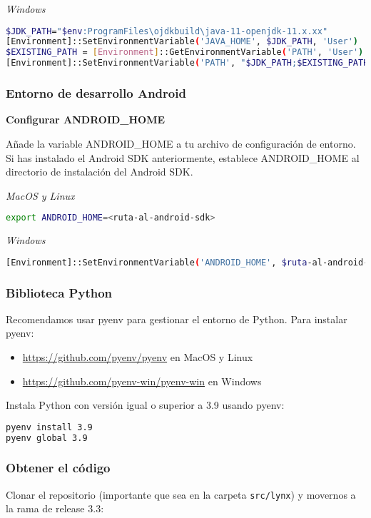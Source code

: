 \textit{Windows}
\begin{lstlisting}[language=bash]
$JDK_PATH="$env:ProgramFiles\ojdkbuild\java-11-openjdk-11.x.xx"
[Environment]::SetEnvironmentVariable('JAVA_HOME', $JDK_PATH, 'User')
$EXISTING_PATH = [Environment]::GetEnvironmentVariable('PATH', 'User')
[Environment]::SetEnvironmentVariable('PATH', "$JDK_PATH;$EXISTING_PATH", 'User')
\end{lstlisting}

\subsubsection{Entorno de desarrollo Android}
\textbf{Configurar ANDROID\_HOME}

Añade la variable ANDROID\_HOME a tu archivo de configuración de entorno. Si has instalado el Android SDK anteriormente, establece ANDROID\_HOME al directorio de instalación del Android SDK.

\textit{MacOS y Linux}
\begin{lstlisting}[language=bash]
export ANDROID_HOME=<ruta-al-android-sdk>
\end{lstlisting}

\textit{Windows}
\begin{lstlisting}[language=bash]
[Environment]::SetEnvironmentVariable('ANDROID_HOME', $ruta-al-android-sdk, 'User')
\end{lstlisting}

\subsubsection{Biblioteca Python}
Recomendamos usar pyenv para gestionar el entorno de Python. Para instalar pyenv:
\begin{itemize}
    \item \url{https://github.com/pyenv/pyenv} en MacOS y Linux
    \item \url{https://github.com/pyenv-win/pyenv-win} en Windows
\end{itemize}

Instala Python con versión igual o superior a 3.9 usando pyenv:
\begin{lstlisting}[language=bash]
pyenv install 3.9
pyenv global 3.9
\end{lstlisting}

\subsubsection{Obtener el código}
Clonar el repositorio (importante que sea en la carpeta \texttt{src/lynx}) y movernos a la rama de release 3.3:

